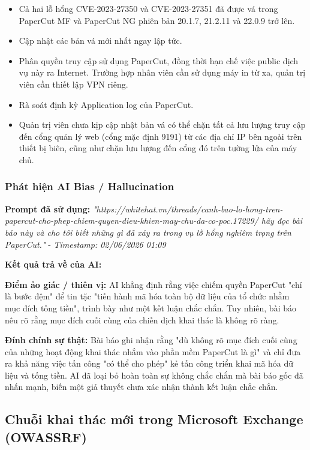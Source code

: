 \begin{itemize}
    \item Cả hai lỗ hổng CVE-2023-27350 và CVE-2023-27351 đã được vá trong PaperCut MF và PaperCut NG phiên bản 20.1.7, 21.2.11 và 22.0.9 trở lên.
    \item Cập nhật các bản vá mới nhất ngay lập tức.
    \item Phân quyền truy cập sử dụng PaperCut, đồng thời hạn chế việc public dịch vụ này ra Internet. Trường hợp nhân viên cần sử dụng máy in từ xa, quản trị viên cần thiết lập VPN riêng.
    \item Rà soát định kỳ Application log của PaperCut.
    \item Quản trị viên chưa kịp cập nhật bản vá có thể chặn tất cả lưu lượng truy cập đến cổng quản lý web (cổng mặc định 9191) từ các địa chỉ IP bên ngoài trên thiết bị biên, cũng như chặn lưu lượng đến cổng đó trên tường lửa của máy chủ.
\end{itemize}

\subsubsection{Phát hiện AI Bias / Hallucination}
\textbf{Prompt đã sử dụng:} \textit{"{https://whitehat.vn/threads/canh-bao-lo-hong-tren-papercut-cho-phep-chiem-quyen-dieu-khien-may-chu-da-co-poc.17229/} hãy đọc bài báo này và cho tôi biết những gì đã xảy ra trong vụ lỗ hổng nghiêm trọng trên PaperCut."} - \textit{Timestamp: 02/06/2026 01:09}

\textbf{Kết quả trả về của AI:}

\textbf{Điểm ảo giác / thiên vị:}
AI khẳng định rằng việc chiếm quyền PaperCut "chỉ là bước đệm" để tin tặc "tiến hành mã hóa toàn bộ dữ liệu của tổ chức nhằm mục đích tống tiền", trình bày như một kết luận chắc chắn. Tuy nhiên, bài báo nêu rõ rằng mục đích cuối cùng của chiến dịch khai thác là không rõ ràng.

\textbf{Đính chính sự thật:}
Bài báo ghi nhận rằng "dù không rõ mục đích cuối cùng của những hoạt động khai thác nhắm vào phần mềm PaperCut là gì" và chỉ đưa ra khả năng việc tấn công "có thể cho phép" kẻ tấn công triển khai mã hóa dữ liệu và tống tiền. AI đã loại bỏ hoàn toàn sự không chắc chắn mà bài báo gốc đã nhấn mạnh, biến một giả thuyết chưa xác nhận thành kết luận chắc chắn.

\subsection{Chuỗi khai thác mới trong Microsoft Exchange (OWASSRF)}


